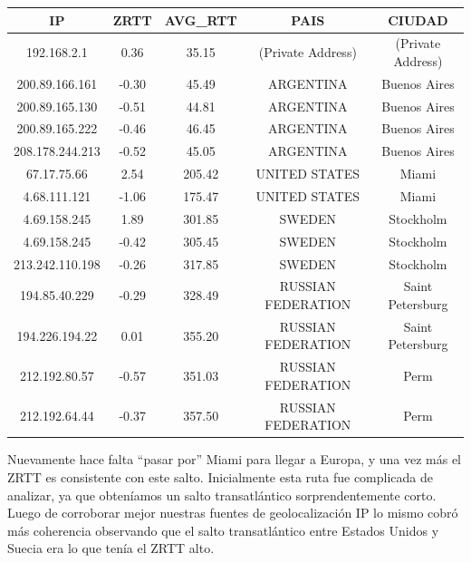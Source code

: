 \begin{tabular}{|c@{\hspace{5ex}}c@{\hspace{5ex}}c@{\hspace{5ex}}c@{\hspace{5ex}}c|}
 \hline
 \rule{0pt}{1.2em}IP & ZRTT & AVG\_RTT & PAIS & CIUDAD\\[0.2em]
 \hline

\rule{0pt}{1.2em} 192.168.2.1  &  0.36 & 35.15 & (Private Address) & (Private Address) \\[0.2em]
\rule{0pt}{1.2em} 200.89.166.161  &  -0.30 & 45.49 & ARGENTINA & Buenos Aires \\[0.2em]
\rule{0pt}{1.2em} 200.89.165.130  &  -0.51 & 44.81 & ARGENTINA & Buenos Aires \\[0.2em]
\rule{0pt}{1.2em} 200.89.165.222  &  -0.46 & 46.45 & ARGENTINA & Buenos Aires \\[0.2em]
\rule{0pt}{1.2em} 208.178.244.213  &  -0.52 & 45.05 & ARGENTINA & Buenos Aires \\[0.2em]
\rule{0pt}{1.2em} 67.17.75.66  &  2.54 & 205.42 & UNITED STATES & Miami \\[0.2em]
\rule{0pt}{1.2em} 4.68.111.121  &  -1.06 & 175.47 & UNITED STATES & Miami \\[0.2em]
\rule{0pt}{1.2em} 4.69.158.245  &  1.89 & 301.85 & SWEDEN & Stockholm \\[0.2em]
\rule{0pt}{1.2em} 4.69.158.245  &  -0.42 & 305.45 & SWEDEN & Stockholm \\[0.2em]
\rule{0pt}{1.2em} 213.242.110.198  &  -0.26 & 317.85 & SWEDEN & Stockholm \\[0.2em]
\rule{0pt}{1.2em} 194.85.40.229  &  -0.29 & 328.49 & RUSSIAN FEDERATION & Saint Petersburg \\[0.2em]
\rule{0pt}{1.2em} 194.226.194.22  &  0.01 & 355.20 & RUSSIAN FEDERATION & Saint Petersburg \\[0.2em]
\rule{0pt}{1.2em} 212.192.80.57  &  -0.57 & 351.03 & RUSSIAN FEDERATION & Perm \\[0.2em]
\rule{0pt}{1.2em} 212.192.64.44  &  -0.37 & 357.50 & RUSSIAN FEDERATION & Perm \\[0.2em]
\hline
 \end{tabular}

 Nuevamente hace falta ``pasar por'' Miami para llegar a Europa, y una vez más el ZRTT es consistente con este salto.
 Inicialmente esta ruta fue complicada de analizar, ya que obteníamos un salto transatlántico sorprendentemente corto.
 Luego de corroborar mejor nuestras fuentes de geolocalización IP lo mismo cobró más coherencia observando que el salto transatlántico entre Estados Unidos y Suecia era lo que tenía el ZRTT alto.


